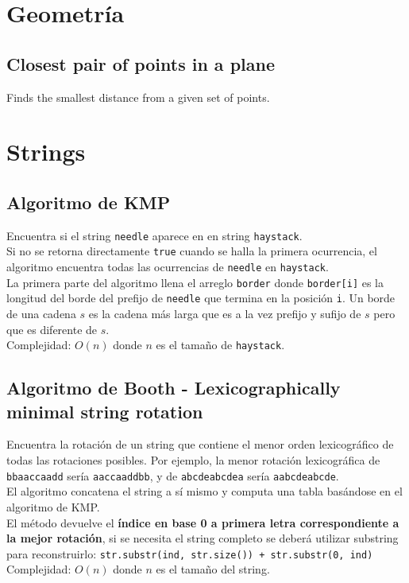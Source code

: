 \documentclass[10pt,letterpaper,twocolumn]{article}
\newcommand{\source}[1]{
  
  \dotfill
}
\begin{document}
\section{Geometría}
  \subsection{Closest pair of points in a plane}
    Finds the smallest distance from a given set of points.
    \source{./src/closest_pair_points.cpp}

\section{Strings}
  \subsection{Algoritmo de KMP}
    Encuentra si el string \verb|needle| aparece en en string \verb|haystack|.\\
    Si no se retorna directamente \verb|true| cuando se halla la primera ocurrencia, el algoritmo encuentra todas las ocurrencias de \verb|needle| en \verb|haystack|.\\
    La primera parte del algoritmo llena el arreglo \verb|border| donde \verb|border[i]| es la longitud del borde del prefijo de \verb|needle| que termina en la posición \verb|i|. Un borde de una cadena $s$ es la cadena más larga que es a la vez prefijo y sufijo de $s$ pero que es diferente de $s$.\\
    Complejidad: $O(n)$ donde $n$ es el tamaño de \verb|haystack|.\\
    \source{./src/kmp.cpp}

  \subsection{Algoritmo de Booth - Lexicographically minimal string rotation}
    Encuentra la rotación de un string que contiene el menor orden lexicográfico de todas las rotaciones posibles. Por ejemplo, la menor rotación lexicográfica de \texttt{bbaaccaadd} sería \texttt{aaccaaddbb}, y de \texttt{abcdeabcdea} sería \texttt{aabcdeabcde}. \\
    El algoritmo concatena el string a sí mismo y computa una tabla basándose en el algoritmo de KMP.\\
    El método devuelve el \textbf{índice en base 0 a primera letra correspondiente a la mejor rotación}, si se necesita el string completo se deberá utilizar substring para reconstruirlo: \texttt{str.substr(ind, str.size()) + str.substr(0, ind)}\\
Complejidad: $O(n)$ donde $n$ es el tamaño del string.
    \source{./src/booths.cpp}
\end{document}
